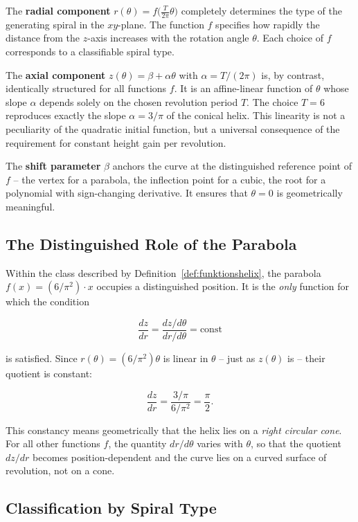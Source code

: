 The \textbf{radial component} $r(\theta) = f\!\bigl(\tfrac{T}{2\pi}\theta\bigr)$
completely determines the type of the generating spiral in the $xy$-plane.
The function $f$ specifies how rapidly the distance from the $z$-axis
increases with the rotation angle $\theta$. Each choice of $f$ corresponds to a
classifiable spiral type.

The \textbf{axial component} $z(\theta) = \beta + \alpha\theta$ with
$\alpha = T/(2\pi)$ is, by contrast, identically structured for all functions $f$.
It is an affine-linear function of $\theta$ whose slope
$\alpha$ depends solely on the chosen revolution period $T$.
The choice $T = 6$ reproduces exactly the slope $\alpha = 3/\pi$ of the
conical helix. This linearity is not a peculiarity of the quadratic
initial function, but a universal consequence of the requirement for
constant height gain per revolution.

The \textbf{shift parameter} $\beta$ anchors the curve at the
distinguished reference point of $f$ -- the vertex for a
parabola, the inflection point for a cubic, the root for a
polynomial with sign-changing derivative. It ensures that
$\theta = 0$ is geometrically meaningful.

\subsection{The Distinguished Role of the Parabola}

Within the class described by Definition~\ref{def:funktionshelix},
the parabola $f(x) = (6/\pi^2)\cdot x$ occupies a
distinguished position. It is the \emph{only} function for which
the condition

\[
\frac{dz}{dr} = \frac{dz/d\theta}{dr/d\theta} = \text{const}
\]

is satisfied. Since $r(\theta) = (6/\pi^2)\theta$ is linear in $\theta$ --
just as $z(\theta)$ is -- their quotient is constant:

\[
\frac{dz}{dr}
= \frac{3/\pi}{6/\pi^2}
= \frac{\pi}{2}.
\]

This constancy means geometrically that the helix lies on a
\emph{right circular cone}. For all other functions $f$, the quantity
$dr/d\theta$ varies with $\theta$, so that the quotient $dz/dr$ becomes position-dependent
and the curve lies on a curved surface of revolution, not
on a cone.

\subsection{Classification by Spiral Type}

